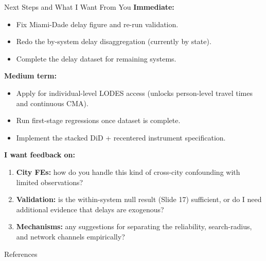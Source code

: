 \documentclass{beamer}
\begin{document}
\begin{frame}{Next Steps and What I Want From You}
\small
\textbf{Immediate:}
\begin{itemize}
    \item Fix Miami-Dade delay figure and re-run validation.
    \item Redo the by-system delay disaggregation (currently by state).
    \item Complete the delay dataset for remaining systems.
\end{itemize}

\medskip
\textbf{Medium term:}
\begin{itemize}
    \item Apply for individual-level LODES access (unlocks person-level travel times
          and continuous CMA).
    \item Run first-stage regressions once dataset is complete.
    \item Implement the stacked DiD + recentered instrument specification.
\end{itemize}

\medskip
\textbf{I want feedback on:}
\begin{enumerate}
    \item \textbf{City FEs:} how do you handle this kind of cross-city confounding with
          limited observations?
    \item \textbf{Validation:} is the within-system null result (Slide 17) sufficient, or
          do I need additional evidence that delays are exogenous?
    \item \textbf{Mechanisms:} any suggestions for separating the reliability,
          search-radius, and network channels empirically?
\end{enumerate}
\end{frame}

\begin{frame}{References}
    \printbibliography[heading=none]
\end{frame}
\end{document}
